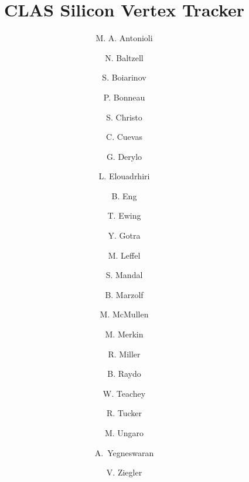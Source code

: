 \title{CLAS Silicon Vertex Tracker}

\author[A]{M. A. Antonioli}
\author[A]{N. Baltzell}
\author[A]{S. Boiarinov}
\author[A]{P. Bonneau}
\author[A]{S. Christo}
\author[A]{C. Cuevas}
\author[B]{G. Derylo}
\author[A]{L. Elouadrhiri}
\author[A]{B. Eng}
\author[A]{T. Ewing}
\author[A]{Y. Gotra}
\author[A]{M. Leffel}
\author[A]{S. Mandal}
\author[A]{B. Marzolf}
\author[A]{M. McMullen}
\author[C]{M. Merkin}
\author[A]{R. Miller}
\author[A]{B. Raydo}
\author[A]{W. Teachey}
\author[D]{R. Tucker}
\author[A]{M. Ungaro}
\author[A]{A.~Yegneswaran}
\author[A]{V. Ziegler}

\address[A]{Thomas Jefferson National Accelerator Facility, Newport News, VA, USA}
\address[B]{Fermi National Accelerator Laboratory, Batavia, IL, USA}
\address[C]{Skobeltsyn Institute of Nuclear Physics, Moscow State University, Moscow, Russia}
\address[D]{Arizona State University, Tempe, AZ}

